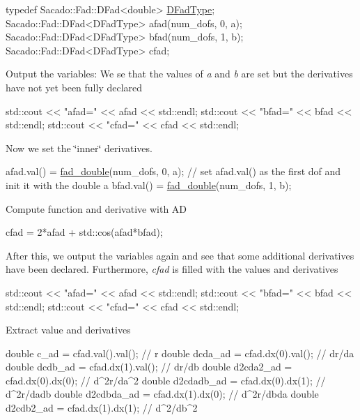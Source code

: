 \begin{DoxyCode}
\textcolor{keyword}{typedef} Sacado::Fad::DFad<double> \hyperlink{Sacado__Wrapper_8h_a7e0893207b87dad05c66a34baac8ed2e}{DFadType};
Sacado::Fad::DFad<DFadType> afad(num\_dofs, 0, a);
Sacado::Fad::DFad<DFadType> bfad(num\_dofs, 1, b);
Sacado::Fad::DFad<DFadType> cfad;
\end{DoxyCode}
 Output the variables\+: We se that the values of {\itshape a} and {\itshape b} are set but the derivatives have not yet been fully declared 
\begin{DoxyCode}
std::cout << \textcolor{stringliteral}{"afad="} << afad << std::endl;
std::cout << \textcolor{stringliteral}{"bfad="} << bfad << std::endl;
std::cout << \textcolor{stringliteral}{"cfad="} << cfad << std::endl;
\end{DoxyCode}
 Now we set the \char`\"{}inner\char`\"{} derivatives. 
\begin{DoxyCode}
afad.val() = \hyperlink{Sacado-auxiliary__functions_8h_a868b94676739e612d9c95940e70892a9}{fad\_double}(num\_dofs, 0, a); \textcolor{comment}{// set afad.val() as the first dof and init it with the
       double a}
bfad.val() = \hyperlink{Sacado-auxiliary__functions_8h_a868b94676739e612d9c95940e70892a9}{fad\_double}(num\_dofs, 1, b);
\end{DoxyCode}
 Compute function and derivative with AD 
\begin{DoxyCode}
cfad = 2*afad + std::cos(afad*bfad);
\end{DoxyCode}
 After this, we output the variables again and see that some additional derivatives have been declared. Furthermore, {\itshape cfad} is filled with the values and derivatives 
\begin{DoxyCode}
std::cout << \textcolor{stringliteral}{"afad="} << afad << std::endl;
std::cout << \textcolor{stringliteral}{"bfad="} << bfad << std::endl;
std::cout << \textcolor{stringliteral}{"cfad="} << cfad << std::endl;
\end{DoxyCode}
 Extract value and derivatives 
\begin{DoxyCode}
\textcolor{keywordtype}{double} c\_ad = cfad.val().val();       \textcolor{comment}{// r}
\textcolor{keywordtype}{double} dcda\_ad = cfad.dx(0).val();    \textcolor{comment}{// dr/da}
\textcolor{keywordtype}{double} dcdb\_ad = cfad.dx(1).val();    \textcolor{comment}{// dr/db}
\textcolor{keywordtype}{double} d2cda2\_ad = cfad.dx(0).dx(0);  \textcolor{comment}{// d^2r/da^2}
\textcolor{keywordtype}{double} d2cdadb\_ad = cfad.dx(0).dx(1); \textcolor{comment}{// d^2r/dadb}
\textcolor{keywordtype}{double} d2cdbda\_ad = cfad.dx(1).dx(0); \textcolor{comment}{// d^2r/dbda}
\textcolor{keywordtype}{double} d2cdb2\_ad = cfad.dx(1).dx(1);  \textcolor{comment}{// d^2/db^2}
\end{DoxyCode}
